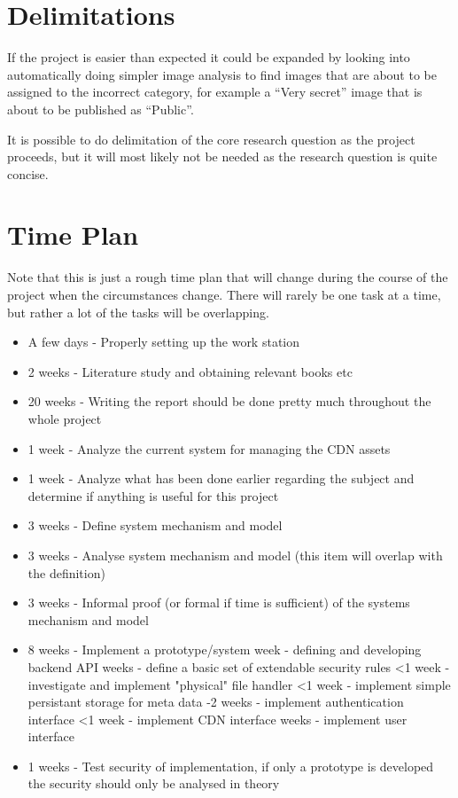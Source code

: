 \documentclass[a4paper,12pt]{article}
\begin{document}
\section{Delimitations}
If the project is easier than expected it could be expanded by looking into 
automatically doing simpler image analysis to find images that are about to 
be assigned to the incorrect category, for example a ``Very secret'' image 
that is about to be published as ``Public''.

It is possible to do delimitation of the core research question as the project 
proceeds, but it will most likely not be needed as the research question is 
quite concise.
\newpage
\section{Time Plan}
Note that this is just a rough time plan that will change during the course of 
the project when the circumstances change.
There will rarely be one task at a time, but rather a lot of the tasks will be 
overlapping.
\begin{itemize}
  \item A few days - Properly setting up the work station
  \item 2 weeks - Literature study and obtaining relevant books etc
  \item 20 weeks - Writing the report should be done pretty much 
  throughout the whole project
  \item 1 week - Analyze the current system for managing the CDN assets
  \item 1 week - Analyze what has been done earlier regarding the 
  subject and determine if anything is useful for this project
  \item 3 weeks - Define system mechanism and model
  \item 3 weeks - Analyse system mechanism and model (this item will overlap with the definition)
  \item 3 weeks - Informal proof (or formal if time is sufficient) of the systems mechanism and model
  \item 8 weeks - Implement a prototype/system
       week - defining and developing backend API
       weeks - define a basic set of extendable security rules
      \subitem <1 week - investigate and implement "physical" file handler
      \subitem <1 week - implement simple persistant storage for meta data
      -2 weeks - implement authentication interface
      \subitem <1 week - implement CDN interface
       weeks - implement user interface
  \item 1 weeks - Test security of implementation, if only a prototype is developed the security should only be analysed in theory
\end{itemize}
\end{document}
